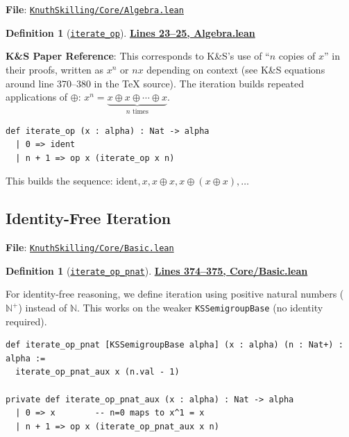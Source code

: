\documentclass[11pt]{article}
\theoremstyle{definition}
\newtheorem{definition}[theorem]{Definition}
\theoremstyle{remark}
\begin{document}
\textbf{File}: \href{https://github.com/zariuq/ks-foundations-of-inference/blob/main/KnuthSkilling/Core/Algebra.lean}{\texttt{KnuthSkilling/Core/Algebra.lean}}

\begin{definition}[\href{https://github.com/zariuq/ks-foundations-of-inference/blob/main/KnuthSkilling/Core/Algebra.lean\#L23}{\texttt{iterate\_op}}]
\textbf{\href{https://github.com/zariuq/ks-foundations-of-inference/blob/main/KnuthSkilling/Core/Algebra.lean\#L23-L25}{Lines 23--25, Algebra.lean}}

\textbf{K\&S Paper Reference}: This corresponds to K\&S's use of ``$n$ copies of $x$'' in their proofs,
written as $x^n$ or $nx$ depending on context (see K\&S equations around line 370--380 in the TeX source).
The iteration builds repeated applications of $\oplus$: $x^n = \underbrace{x \oplus x \oplus \cdots \oplus x}_{n \text{ times}}$.
\end{definition}

\begin{lstlisting}[caption={Iteration definition}]
def iterate_op (x : alpha) : Nat -> alpha
  | 0 => ident
  | n + 1 => op x (iterate_op x n)
\end{lstlisting}

This builds the sequence: $\text{ident}, x, x \oplus x, x \oplus (x \oplus x), \ldots$

\subsection{Identity-Free Iteration}

\textbf{File}: \href{https://github.com/zariuq/ks-foundations-of-inference/blob/main/KnuthSkilling/Core/Basic.lean}{\texttt{KnuthSkilling/Core/Basic.lean}}

\begin{definition}[\href{https://github.com/zariuq/ks-foundations-of-inference/blob/main/KnuthSkilling/Core/Basic.lean\#L374}{\texttt{iterate\_op\_pnat}}]
\textbf{\href{https://github.com/zariuq/ks-foundations-of-inference/blob/main/KnuthSkilling/Core/Basic.lean\#L374-L375}{Lines 374--375, Core/Basic.lean}}

For identity-free reasoning, we define iteration using positive natural numbers ($\mathbb{N}^+$) instead of $\mathbb{N}$. This works on the weaker \texttt{KSSemigroupBase} (no identity required).
\end{definition}

\begin{lstlisting}[caption={Identity-free iteration}]
def iterate_op_pnat [KSSemigroupBase alpha] (x : alpha) (n : Nat+) : alpha :=
  iterate_op_pnat_aux x (n.val - 1)

private def iterate_op_pnat_aux (x : alpha) : Nat -> alpha
  | 0 => x        -- n=0 maps to x^1 = x
  | n + 1 => op x (iterate_op_pnat_aux x n)
\end{lstlisting}
\end{document}
